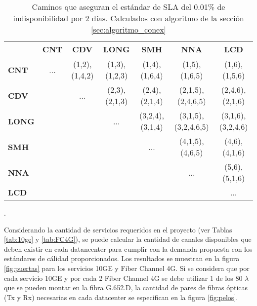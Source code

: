 \begin{table}[!hbt]
\begin{center}
\begin{tabular}{||l | c | c | c | c | c | c||}
\hline
\hline
 & \textbf{CNT} & \textbf{CDV} & \textbf{LONG} & \textbf{SMH} & \textbf{NNA} & \textbf{LCD}  \\
\hline
\textbf{CNT} & ... & (1,2),(1,4,2) & (1,3),(1,2,3) & (1,4),(1,6,4) & (1,5),(1,6,5) & (1,6),(1,5,6)\\
\hline
\textbf{CDV} &  & ... & (2,3),(2,1,3) & (2,4),(2,1,4) & (2,1,5),(2,4,6,5) & (2,4,6),(2,1,6)\\
\hline
\textbf{LONG} &  &  & ... & (3,2,4),(3,1,4) & (3,1,5),(3,2,4,6,5) & (3,1,6),(3,2,4,6)\\
\hline
\textbf{SMH} &  &  &  & ... & (4,1,5),(4,6,5) & (4,6),(4,1,6)\\
\hline
\textbf{NNA} & & & & & ... & (5,6),(5,1,6)\\
\hline
\textbf{LCD} & & & & & & ... \\
\hline
\end{tabular}
  \caption[Caminos calculados por algoritmo de disponibilidad]{Caminos que aseguran el estándar de SLA del 0.01\% de indisponibilidad por 2 días. Calculados con algoritmo de la sección \ref{sec:algoritmo_conex}}.
  \label{fig:caminos}
\end{center}
\end{table}


Considerando la cantidad de servicios requeridos en el proyecto (ver Tablas \ref{tab:10ge} y \ref{tab:FC4G}), se puede calcular la cantidad de canales disponibles que deben existir en cada datancenter para cumplir con la demanda propuesta con los estándares de cálidad proporcionados. Los resultados se muestran en la figura \ref{fig:puertas} para los servicios 10GE y Fiber Channel 4G. Si se considera que por cada servicio 10GE y por cada 2 Fiber Channel 4G se debe utilizar 1 de los 80 $\lambda$ que se pueden montar en la fibra G.652.D, la cantidad de pares de fibras ópticas (Tx y Rx) necesarias en cada datacenter se especifican en la figura \ref{fig:pelos}.

